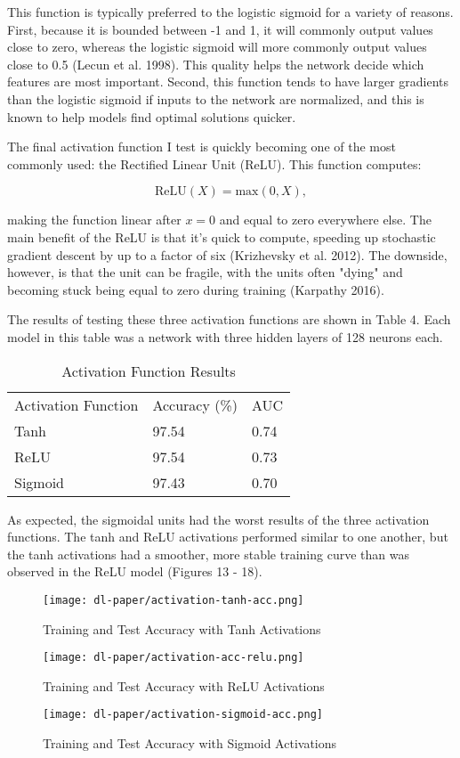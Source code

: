 \documentclass[12pt]{article}  %
\theoremstyle{definition}
\theoremstyle{remark}
\begin{document}
\par This function is typically preferred to the  logistic sigmoid for a variety of reasons. First, because it is bounded between -1 and 1,  it will commonly output values close to zero, whereas the logistic sigmoid will more commonly output values close to 0.5 (Lecun et al. 1998). This quality helps the network decide which features are most important. Second,  this function tends to have larger gradients than the logistic sigmoid if inputs to the network are normalized, and this is known to help models find optimal solutions quicker. 
\par The final activation function I test is quickly becoming one of the most commonly used: the Rectified Linear Unit (ReLU). This function computes:

$$ \text{ReLU}(X) = \text{max}(0,X), $$

making the function linear after $x=0$ and equal to zero everywhere else. The main benefit of the ReLU is that it's quick to compute, speeding up stochastic gradient descent by up to a factor of six (Krizhevsky et al. 2012). The downside, however, is that the unit can be fragile, with the units often "dying" and becoming stuck being equal to zero during training (Karpathy 2016).

\par The results of testing these three activation functions are shown in Table 4. Each model in this table was a network with three hidden layers of 128 neurons each. 

\begin{table}[!h]
\centering
\caption{Activation Function Results}
\label{my-label}
\begin{tabular}{lll}
Activation Function & Accuracy (\%) & AUC  \\
Tanh                & 97.54         & 0.74 \\
ReLU                & 97.54         & 0.73 \\
Sigmoid             & 97.43         & 0.70
\end{tabular}
\end{table}

\par As expected, the sigmoidal units had the worst results of the three activation functions. The tanh and ReLU activations performed similar to one another, but the tanh activations had a smoother, more stable training curve than was observed in the ReLU model (Figures 13 - 18). 

\begin{figure}[!h]
  \texttt{[image: dl-paper/activation-tanh-acc.png]}
  \caption{Training and Test Accuracy with Tanh Activations}\label{tanh-acc}
\endminipage\hfill
{}
  \texttt{[image: dl-paper/activation-acc-relu.png]}
  \caption{Training and Test Accuracy with ReLU Activations}\label{relu-acc}
\endminipage\hfill
{}%
  \texttt{[image: dl-paper/activation-sigmoid-acc.png]}
  \caption{Training and Test Accuracy with Sigmoid Activations}\label{sigmoid-acc}
\endminipage
\end{figure}
\end{document}
